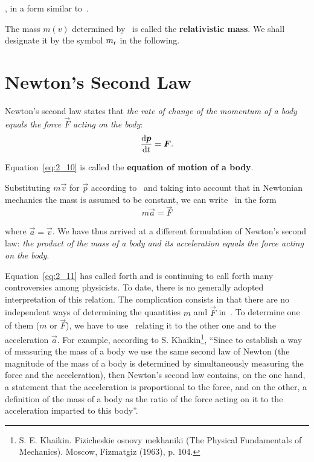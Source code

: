 \noindent
\ie, in a form similar to~.

The mass $m(v)$ determined by~ is called the \textbf{relativistic mass}. We shall designate it by the symbol $m_{\text{r}}$ in the following.

\section{Newton's Second Law}\label{sec:2_4}

Newton's second law states that \textit{the rate of change of the momentum of a body equals the force $\vec{F}$ acting on the body}:
\begin{equation}\label{eq:2_10}
\frac{\mathrm{d}\boldsymbol{p}}{\mathrm{d} t} = \boldsymbol{F}.
\end{equation}

\noindent
Equation~\eqref{eq:2_10} is called the \textbf{equation of motion of a body}.

Substituting $m\vec{v}$ for $\vec{p}$ according to~ and taking into account that in Newtonian mechanics the mass is assumed to be constant, we can write~ in the form
\begin{equation}\label{eq:2_11}
m\vec{a} = \vec{F}
\end{equation}

\noindent
where $\vec{a}=\dot{\vec{v}}$. We have thus arrived at a different formulation of Newton's second law: \textit{the product of the mass of a body and its acceleration equals the force acting on the body}.

Equation~\eqref{eq:2_11} has called forth and is continuing to call forth many controversies among physicists. To date, there is no generally adopted interpretation of this relation. The complication consists in that there are no independent ways of determining the quantities $m$ and $\vec{F}$ in~. To determine one of them ($m$ or $\vec{F}$), we have to use~ relating it to the other one and to the acceleration $\vec{a}$. For example, according to S. Khaikin\footnote{S. E. Khaikin. Fizicheskie osnovy mekhaniki (The Physical Fundamentals of Mechanics). Moscow, Fizmatgiz (1963), p. 104.}, ``Since to establish a way of measuring the mass of a body we use the same second law of Newton (the magnitude of the mass of a body is determined by simultaneously measuring the force and the acceleration), then Newton's second law contains, on the one hand, a statement that the acceleration is proportional to the force, and on the other, a definition of the mass of a body as the ratio of the force acting on it to the acceleration imparted to this body''.

